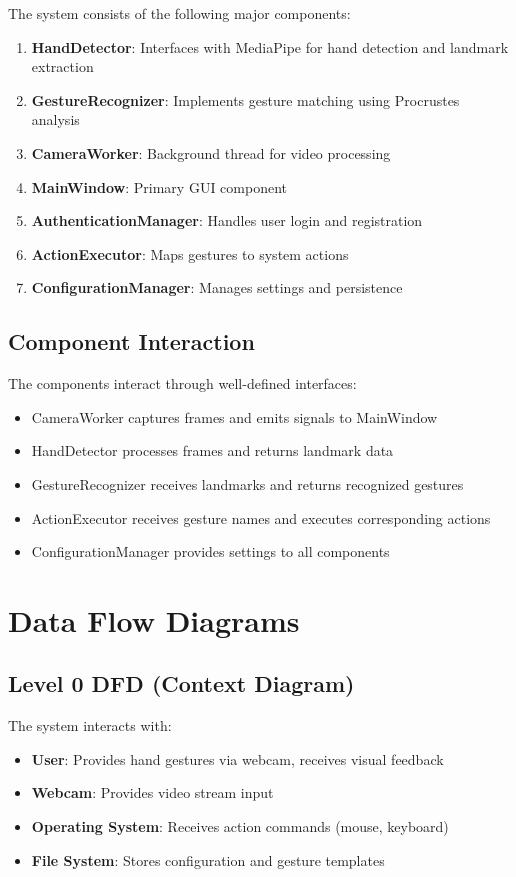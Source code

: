 \documentclass[12pt,a4paper]{report}
\begin{document}
The system consists of the following major components:

\begin{enumerate}
    \item \textbf{HandDetector}: Interfaces with MediaPipe for hand detection and landmark extraction
    \item \textbf{GestureRecognizer}: Implements gesture matching using Procrustes analysis
    \item \textbf{CameraWorker}: Background thread for video processing
    \item \textbf{MainWindow}: Primary GUI component
    \item \textbf{AuthenticationManager}: Handles user login and registration
    \item \textbf{ActionExecutor}: Maps gestures to system actions
    \item \textbf{ConfigurationManager}: Manages settings and persistence
\end{enumerate}

\subsection{Component Interaction}

The components interact through well-defined interfaces:

\begin{itemize}
    \item CameraWorker captures frames and emits signals to MainWindow
    \item HandDetector processes frames and returns landmark data
    \item GestureRecognizer receives landmarks and returns recognized gestures
    \item ActionExecutor receives gesture names and executes corresponding actions
    \item ConfigurationManager provides settings to all components
\end{itemize}

\section{Data Flow Diagrams}

\subsection{Level 0 DFD (Context Diagram)}

The system interacts with:
\begin{itemize}
    \item \textbf{User}: Provides hand gestures via webcam, receives visual feedback
    \item \textbf{Webcam}: Provides video stream input
    \item \textbf{Operating System}: Receives action commands (mouse, keyboard)
    \item \textbf{File System}: Stores configuration and gesture templates
\end{itemize}
\end{document}
